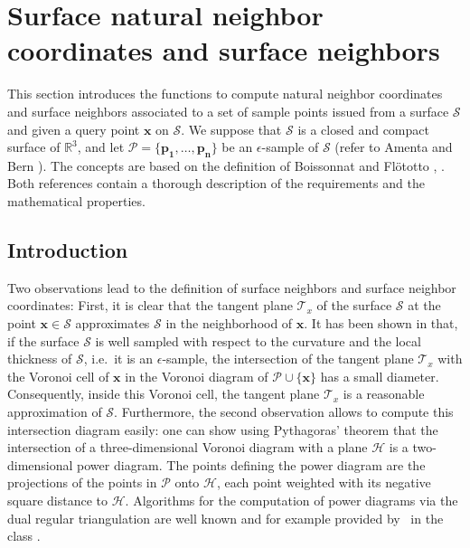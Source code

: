 \section{Surface natural neighbor coordinates and surface neighbors}\label{sec:surface}

This section introduces the functions to compute natural neighbor
coordinates and surface neighbors associated to a set of sample points
issued from a surface $\mathcal{S}$ and given a query point
$\mathbf{x}$ on $\mathcal{S}$. We suppose that $\mathcal{S}$ is a
closed and compact surface of $\mathbb{R}^3$, and let $\mathcal{P}=
\{\mathbf{p_1}, \ldots,\mathbf{p_n}\}$ be an $\epsilon$-sample of
$\mathcal{S}$ (refer to Amenta and Bern \cite{ab-srvf-99}). The
concepts are based on the definition of Boissonnat and Fl\"ototto
\cite{bf-lcss-02}, \cite{prisme-these-flototto}.  Both references
contain a thorough description of the requirements and the
mathematical properties.

\subsection{Introduction}

Two observations lead to the definition of surface neighbors and
surface neighbor coordinates: First, it is clear that the tangent
plane $\mathcal{T}_x$ of the surface $\mathcal{S}$ at the point
$\mathbf{x} \in \mathcal{S}$ approximates $\mathcal{S}$ in the
neighborhood of $\mathbf{x}$. It has been shown in \cite{bf-lcss-02}
that, if the surface $\mathcal{S}$ is well sampled with respect to the
curvature and the local thickness of $\mathcal{S}$, i.e.\ it is an $\epsilon$-sample, the intersection
of the tangent plane $\mathcal{T}_x$ with the Voronoi cell of
$\mathbf{x}$ in the Voronoi diagram of $\mathcal{P} \cup
\{\mathbf{x}\}$ has a small diameter.  Consequently, inside this
Voronoi cell, the tangent plane $\mathcal{T}_x$ is a reasonable
approximation of $\mathcal{S}$. Furthermore, the second observation
allows to compute this intersection diagram easily: one can show using
Pythagoras' theorem that the intersection of a three-dimensional
Voronoi diagram with a plane $\mathcal{H}$ is a two-dimensional power
diagram. The points defining the power diagram are the projections of
the points in $\mathcal{P}$ onto $\mathcal{H}$, each point weighted
with its negative square distance to $\mathcal{H}$. Algorithms for the
computation of power diagrams via the dual regular triangulation are
well known and for example provided by \cgal\ in the class
.

